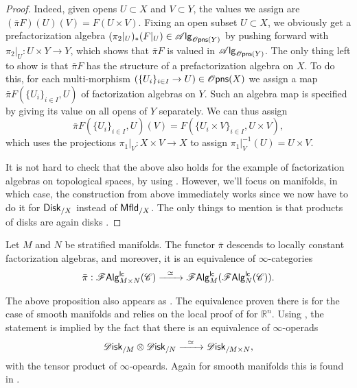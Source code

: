 \documentclass[../text]{subfiles}
\begin{document}
\begin{proof}
    Indeed, given opens $U \subset X$ and $V \subset Y$, the values we assign are $(\bar{\pi}F) (U)(V) = F(U \times V)$. Fixing an open subset $U \subset X$, we obviously get a prefactorization algebra $(\pi_2|_U)_* (F|_U) \in \alg{\opens(Y)}$ by pushing forward with $\pi_2|_U: U \times Y \rightarrow Y$, which shows that $\bar{\pi}F$ is valued in $\alg{\opens(Y)}$. The only thing left to show is that $\bar{\pi} F$ has the structure of a prefactorization algebra on $X$. To do this, for each multi-morphism $(\{ U_i \}_{i \in I} \rightarrow U) \in \opens(X)$ we assign a map $\bar{\pi}F (\{ U_i \}_{i \in I}, U)$ of factorization algebras on $Y$. Such an algebra map is specified by giving its value on all opens of $Y$ separately. We can thus assign
    \begin{equation}
        \bar{\pi}F (\{ U_i \}_{i \in I}, U)(V) = F(\{ U_i \times V \}_{i \in I}, U \times V),
    \end{equation}
    which uses the projections $\pi_1|_V : X \times V \rightarrow X$ to assign $\pi_1|_V^{-1}(U) = U \times V$.

    It is not hard to check that the above also holds for the example of factorization algebras on topological spaces, by using . However, we'll focus on manifolds, in which case, the construction from above immediately works since we now have to do it for $\disk[r]_{/X}$ instead of $\mfld[r]_{/X}$. The only things to mention is that products of disks are again disks \cite[cor.3.4.9]{aft_localstrut}.
\end{proof}


\begin{proposition}\label{prop:exp_of_products_lc}
    Let $M$ and $N$ be stratified manifolds. The functor $\bar{\pi}$ descends to locally constant factorization algebras, and moreover, it is an equivalence of $\infty$-categories
    \begin{equation}
        \bar{\pi}: \mathscr{F} \mathsf{Alg}^{\mathsf{lc}}_{M \times N}(\mathscr{C}) \xrightarrow{\ \ \simeq \ \ } \mathscr{F} \mathsf{Alg}^{\mathsf{lc}}_{M}(\mathscr{F} \mathsf{Alg}^{\mathsf{lc}}_{N}(\mathscr{C})).
    \end{equation}
\end{proposition}

\begin{remark}
    The above proposition also appears as \cite[prop.18]{ginot2015}. The equivalence proven there is for the case of smooth manifolds and relies on the local proof of \cite{lurie_ha} for $\mathbb{R}^n$. Using , the statement is implied by the fact that there is an equivalence of $\infty$-operads
    \begin{equation}
        \disk_{/M} \otimes \disk_{/N} \xrightarrow{\ \ \simeq \ \ } \disk_{/M \times N},
    \end{equation}
    with the tensor product of $\infty$-opeards. Again for smooth manifolds this is found in \cite[ex.5.4.5.5]{lurie_ha}.
\end{remark}
\end{document}
